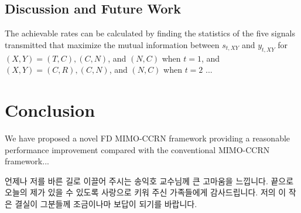 \documentclass[master,english,final]{kaist-ucs} %
\begin{document}
\section{Discussion and Future Work}
\noindent
The achievable rates can be calculated by finding the statistics of the five signals transmitted that maximize the mutual information between $s_{t,XY}$ and $y_{t,XY}$ for $(X,Y)=(T,C), (C,N)$, and $(N,C)$ when $t=1$, and $(X,Y)=(C,R), (C,N)$, and $(N,C)$ when $t=2$ \cite{SOCA2,EF2}...

\chapter{Conclusion}
\noindent
We have proposed a novel FD MIMO-CCRN framework providing a reasonable performance improvement compared with the conventional MIMO-CCRN framework...
% 




\acknowledgment[4]
언제나 저를 바른 길로 이끌어 주시는 송익호 교수님께 큰 고마움을 느낍니다.
끝으로 오늘의 제가 있을 수 있도록 사랑으로 키워 주신 가족들에게 감사드립니다.
저의 이 작은 결실이 그분들께 조금이나마 보답이 되기를 바랍니다.

\curriculumvitae[4]

\begin{personaldata}
	\address    {...}
\end{personaldata}
\end{document}
